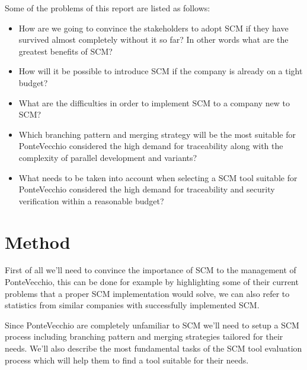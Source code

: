 \documentclass[10pt]{article}
\begin{document}
\hfill \break
\noindent Some of the problems of this report are listed as follows:
\begin{itemize}
\item How are we going to convince the stakeholders to adopt SCM if they have survived almost completely without it so far? In other words what are the greatest benefits of SCM?
\item How will it be possible to introduce SCM if the company is already on a tight budget?
\item What are the difficulties in order to implement SCM to a company new to SCM?
\item Which branching pattern and merging strategy will be the most suitable for PonteVecchio considered the high demand for traceability along with the complexity of parallel development and variants?
\item What needs to be taken into account when selecting a SCM tool suitable for PonteVecchio considered the high demand for traceability and security verification within a reasonable budget?
\end{itemize}

\section{Method}
First of all we’ll need to convince the importance of SCM to the management of PonteVecchio, this can be done for example by highlighting some of their current problems that a proper SCM implementation would solve, we can also refer to statistics from similar companies with successfully implemented SCM.

\noindent Since PonteVecchio are completely unfamiliar to SCM we’ll need to setup a SCM process including branching pattern and merging strategies tailored for their needs. We’ll also describe the most fundamental tasks of the SCM tool evaluation process which will help them to find a tool suitable for their needs.
\end{document}

